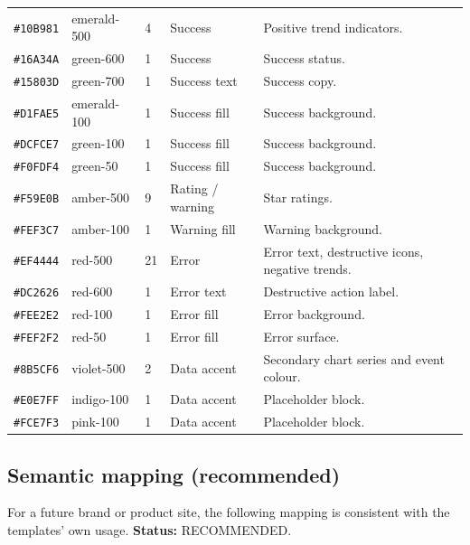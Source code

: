 \begin{longtable}{@{}L{2.3cm}L{2.2cm}L{1.7cm}L{1.2cm}L{5.8cm}@{}}
\texttt{\#10B981} & emerald-500 & 4 & Success & Positive trend indicators. \\
\texttt{\#16A34A} & green-600 & 1 & Success & Success status. \\
\texttt{\#15803D} & green-700 & 1 & Success text & Success copy. \\
\texttt{\#D1FAE5} & emerald-100 & 1 & Success fill & Success background. \\
\texttt{\#DCFCE7} & green-100 & 1 & Success fill & Success background. \\
\texttt{\#F0FDF4} & green-50 & 1 & Success fill & Success background. \\
\texttt{\#F59E0B} & amber-500 & 9 & Rating / warning & Star ratings. \\
\texttt{\#FEF3C7} & amber-100 & 1 & Warning fill & Warning background. \\
\texttt{\#EF4444} & red-500 & 21 & Error & Error text, destructive icons, negative
trends. \\
\texttt{\#DC2626} & red-600 & 1 & Error text & Destructive action label. \\
\texttt{\#FEE2E2} & red-100 & 1 & Error fill & Error background. \\
\texttt{\#FEF2F2} & red-50 & 1 & Error fill & Error surface. \\
\texttt{\#8B5CF6} & violet-500 & 2 & Data accent & Secondary chart series and event
colour. \\
\texttt{\#E0E7FF} & indigo-100 & 1 & Data accent & Placeholder block. \\
\texttt{\#FCE7F3} & pink-100 & 1 & Data accent & Placeholder block. \\
\bottomrule
\end{longtable}

\subsection*{Semantic mapping (recommended)}

For a future brand or product site, the following mapping is consistent with the
templates' own usage. \textbf{Status:} RECOMMENDED.

